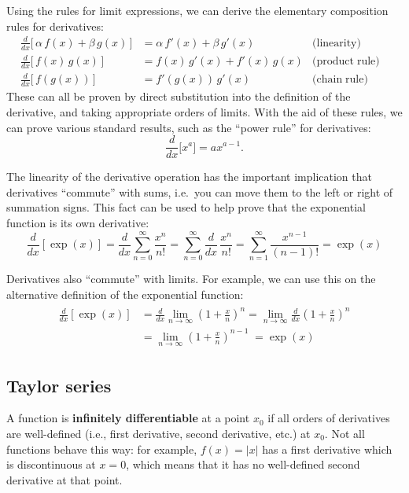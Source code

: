\documentclass[10pt,a4paper]{article}
\begin{document}
Using the rules for limit expressions, we can derive the elementary
composition rules for derivatives:
\begin{equation}
\begin{aligned}\frac{d}{dx}\big[\,\alpha\, f(x) + \beta\, g(x)\,\big] &= \alpha\, f'(x) + \beta\, g'(x) \quad &\textrm{(linearity)}& \\   \frac{d}{dx}\big[\,f(x) \, g(x)\,\big] &= f(x) \, g'(x) + f'(x) \, g(x) &\textrm{(product}\;\textrm{rule)}& \\   \frac{d}{dx}\big[\,f(g(x))\,\big] &= f'(g(x)) \, g'(x) &\textrm{(chain}\;\textrm{rule)}&\end{aligned}
\end{equation}
These can all be proven by direct substitution into the definition of
the derivative, and taking appropriate orders of limits. With the aid of
these rules, we can prove various standard results, such as the ``power
rule'' for derivatives: \[\frac{d}{dx} \big[x^a\big] = a x^{a-1}.\]

The linearity of the derivative operation has the important
implication that derivatives ``commute'' with sums, i.e.~you can move
them to the left or right of summation signs. This fact can be used to
help prove that the exponential function is its own derivative:
\begin{equation}
  \frac{d}{dx} \left[\exp(x)\right] = \frac{d}{dx} \sum_{n=0}^\infty\frac{x^n}{n!} = \sum_{n=0}^\infty\frac{d}{dx} \, \frac{x^n}{n!} = \sum_{n=1}^\infty \frac{x^{n-1}}{(n-1)!} =\exp(x)
\end{equation}

Derivatives also ``commute'' with limits. For example, we can use this
on the alternative definition of the exponential function:
\begin{align}
  \begin{aligned}
  \frac{d}{dx} \left[\exp(x)\right] &=
  \frac{d}{dx} \lim_{n\rightarrow\infty} \left(1+\frac{x}{n}\right)^n
  = \lim_{n\rightarrow\infty} \frac{d}{dx} \left(1+\frac{x}{n}\right)^n \\
  &= \lim_{n\rightarrow\infty} \left(1+\frac{x}{n}\right)^{n-1}
  \;= \exp(x)
  \end{aligned}
\end{align}

\subsection{Taylor series}

A function is \textbf{infinitely differentiable} at a point $x_0$ if
all orders of derivatives are well-defined (i.e., first derivative,
second derivative, etc.) at $x_0$. Not all functions behave this way:
for example, $f(x) = |x|$ has a first derivative which is
discontinuous at $x = 0$, which means that it has no well-defined
second derivative at that point.
\end{document}
